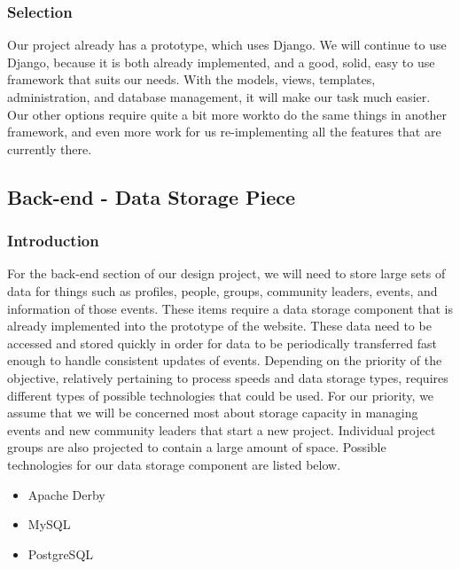 \documentclass[draftclsnofoot,10pt,onecolumn]{IEEEtran} %
\begin{document}
\subsubsection{Selection}
Our project already has a prototype, which uses Django. We will continue to use Django, because it is both already
implemented, and a good, solid, easy to use framework that suits our needs. With the models, views, templates,
administration, and database management, it will make our task much easier. Our other options require quite a bit more workto do the same things in another framework, and even more work for us re-implementing all the features that are currently
there. \\

\subsection{Back-end - Data Storage Piece}

\subsubsection{Introduction}
For the back-end section of our design project, we will need to store large sets of data for things such as profiles, people,
groups, community leaders, events, and information of those events. These items require a data storage component that is
already implemented into the prototype of the website. These data need to be accessed and stored quickly in order for data to
be periodically transferred fast enough to handle consistent updates of events. Depending on the priority of the objective,
relatively pertaining to process speeds and data storage types, requires different types of possible technologies that could be
used. For our priority, we assume that we will be concerned most about storage capacity in managing events and new
community leaders that start a new project. Individual project groups are also projected to contain a large amount of space.
Possible technologies for our data storage component are listed below. \\

	\begin{itemize}
		\item Apache Derby
		\item MySQL
		\item PostgreSQL \\
	\end{itemize}
	
\end{document}
